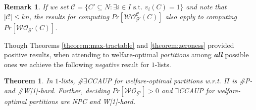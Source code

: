 \documentclass[letterpaper]{article} %
\newtheorem{theorem}{Theorem}
\newtheorem{remark}{Remark}
\begin{document}
\begin{remark}
If we set $\mathcal{C} = \{C' \subseteq N : \exists i \in I \text{ s.t. } v_i(C) = 1\}$ and note that $|\mathcal{C}| \leq kn$, the results for computing $Pr[\mathcal{WO}^{\mathcal{C}}_{\mathcal{G}'}(C)]$ also apply to computing $Pr[\mathcal{WO}_{\mathcal{G}'}(C)]$.
\end{remark}


Though Theorems \ref{theorem:max-tractable} and \ref{theorem:zeroness} provided positive results, when attending to welfare-optimal \textit{partitions} among \textbf{\textit{all}} possible ones we achieve the following \textit{negative} result for $1$-lists.
\begin{theorem}
\label{theorem:max-intractable}
In $1$-lists, \#$\exists$CCAUP for welfare-optimal partitions w.r.t. $\Pi$ is \#P- and \#W[1]-hard. Further, deciding $Pr[\mathcal{WO}_{\mathcal{G}'}] > 0$ and $\exists$CCAUP for welfare-optimal partitions are NPC and W[1]-hard.
\end{theorem}
\end{document}
